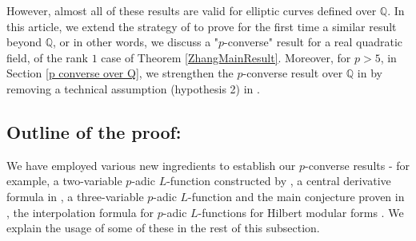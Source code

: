 \documentclass[reqno,10pt]{amsart}
\newcommand{\q}{\mathbb{Q}}
\theoremstyle{plain}
\theoremstyle{definition}
\begin{document}
\noindent However, almost all of these results are valid for elliptic curves defined over $\q$. In this article, we  extend the strategy of \cite{Rodolfo} to prove for the first time a similar result beyond $\q$, or in other words, we discuss a "$p$-converse" result for a real quadratic field, of the rank $1$ case of Theorem \ref{ZhangMainResult}. Moreover, for  $p > 5$, in Section \ref{p converse over Q}, we strengthen the $p$-converse result   over $\q$ in  \cite{Rodolfo} by removing a technical assumption (hypothesis 2) in \cite[Theorem A]{Rodolfo}.  %


\subsection{Outline  of the proof:}
We have employed various new ingredients to establish our $p$-converse results - for example, a two-variable $p$-adic $L$-function constructed by \cite{MokExceptionalZero}, a central derivative formula in \cite{MokHeegnerPoints}, a three-variable $p$-adic $L$-function and the main conjecture proven in \cite{Wan}, the interpolation formula for $p$-adic $L$-functions for Hilbert modular forms \cite{BergdallHansen}. We explain the usage of some of these in the rest of this subsection.
\\
\end{document}

